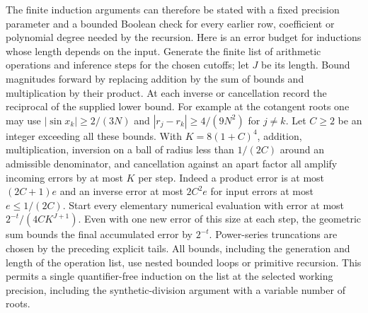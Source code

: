 The finite induction arguments can therefore be stated with a fixed precision
parameter and a bounded Boolean check for every earlier row, coefficient
or polynomial degree needed by the recursion.
Here is an error budget for inductions whose length depends on the
input. Generate the finite list of arithmetic operations and inference
steps for the chosen cutoffs; let $J$ be its length. Bound magnitudes
forward by replacing addition by the sum of bounds and multiplication
by their product. At each inverse or cancellation record the reciprocal
of the supplied lower bound. For example at the cotangent roots one may
use $|\sin x_k|\ge 2/(3N)$ and
$|r_j-r_k|\ge 4/(9N^2)$ for $j\ne k$.
Let $C\ge2$ be an integer exceeding all these bounds. With
$K=8(1+C)^4$, addition, multiplication, inversion on a ball of radius
less than $1/(2C)$ around an admissible denominator, and cancellation
against an apart factor all amplify incoming errors by at most $K$ per
step. Indeed a product error is at most $(2C+1)e$ and an inverse error
at most $2C^2e$ for input errors at most $e\le1/(2C)$.
Start every elementary numerical evaluation with error at most
$2^{-t}/(4CK^{J+1})$. Even with one new error of this size at each step,
the geometric sum bounds the final accumulated error by $2^{-t}$.
Power-series truncations are chosen by the preceding explicit tails.
All bounds, including the generation and length of the operation list,
use nested bounded loops or primitive recursion. This permits a single
quantifier-free induction on the list at the selected working precision,
including the synthetic-division argument with a variable number of roots.

